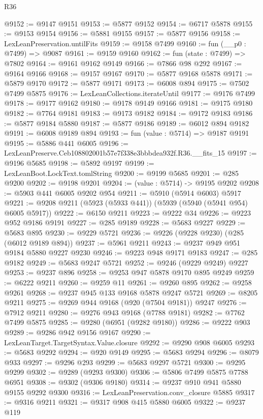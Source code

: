 \begin{lexlean}{R36}
\begin{coremodule}
@9152 := @9147 @9151
@9153 := @5877 @9152
@9154 := @6717 @5878
@9155 := @9153 @9154
@9156 := @5881 @9155
@9157 := @5877 @9156
@9158 := LexLeanPreservation.untilFits
@9159 := @9158 @7499
@9160 := fun (__p0 : @7499) => @9087
@9161 := @9159 @9160
@9162 := fun (state : @7499) => @7802
@9164 := @9161 @9162 @9149
@9166 := @7866 @98 @292
@9167 := @9164 @9166
@9168 := @9157 @9167
@9170 := @5877 @9168 @5878
@9171 := @5879 @9170
@9172 := @5877 @9171
@9173 := @6008 @894
@9175 := @7502 @7499 @5875
@9176 := LexLeanCollections.iterateUntil
@9177 := @9176 @7499
@9178 := @9177 @9162
@9180 := @9178 @9149 @9166
@9181 := @9175 @9180
@9182 := @7764 @9181
@9183 := @9173 @9182
@9184 := @9172 @9183
@9186 := @5877 @9184 @5880
@9187 := @5877 @9186
@9189 := @6012 @894 @9182
@9191 := @6008 @9189 @894
@9193 := fun (value : @5714) => @9187 @9191
@9195 := @5886 @441 @6005
@9196 := LexLeanPreserve.Ceb108802001b57e7f338e3bbbdea932f.R36.__fits_15
@9197 := @9196 @5685
@9198 := @5892 @9197
@9199 := LexLeanBoot.LockText.tomlString
@9200 := @9199 @5685
@9201 := @285 @9200
@9202 := @9198 @9201
@9204 := (value : @5714) -> @9195 @9202
@9208 := @5903 @441 @6005 @9202 @954
@9211 := @5910 (@5914 @6003) @5917
@9221 := @9208 @9211 (@5923 (@5933 @441)) (@5939 (@5940 (@5941 @954) @6005 @5917))
@9222 := @6150 @9211
@9223 := @9222 @34
@9226 := @9223 @952 @9186 @9191
@9227 := @285 @9189
@9228 := @5683 @9227
@9229 := @5683 @895
@9230 := @9229 @5721
@9236 := @9226 (@9228 @9230) (@285 (@6012 @9189 @894))
@9237 := @5961 @9211
@9243 := @9237 @949 @951 @9184 @5880 @9227 @9230
@9246 := @9223 @948 @9171 @9183
@9247 := @285 @9182
@9249 := @5683 @9247 @5721
@9252 := @9246 (@9229 @9249) @9227
@9253 := @9237 @896
@9258 := @9253 @947 @5878 @9170 @895 @9249
@9259 := @6222 @9211
@9260 := @9259 @11
@9261 := @9260 @895
@9262 := @9258 @9261
@9268 := @9237 @945 @133 @9168 @5878 @9247 @5721
@9269 := @8205 @9211
@9275 := @9269 @944 @9168 (@920 (@7504 @9181)) @9247
@9276 := @7912 @9211
@9280 := @9276 @943 @9168 (@7788 @9181)
@9282 := @7762 @7499 @5875
@9285 := @9280 (@6951 (@9282 @9180))
@9286 := @9222 @903
@9289 := @9286 @942 @9156 @9167
@9290 := LexLeanTarget.TargetSyntax.Value.closure
@9292 := @9290 @908 @6005
@9293 := @5683 @9292
@9294 := @920 @9149
@9295 := @5683 @9294
@9296 := @8079 @933
@9297 := @9296 @293
@9299 := @5683 @9297 @5721
@9300 := @9295 @9299
@9302 := @9289 (@9293 @9300)
@9306 := @5806 @7499 @5875 @7788 @6951
@9308 := @9302 (@9306 @9180)
@9314 := @9237 @910 @941 @5880 @9155 @9292 @9300
@9316 := LexLeanPreservation.conv_closure @5885
@9317 := @9316 @9211
@9321 := @9317 @908 @415 @5880 @6005
@9322 := @9237 @119

\end{coremodule}
\end{lexlean}
